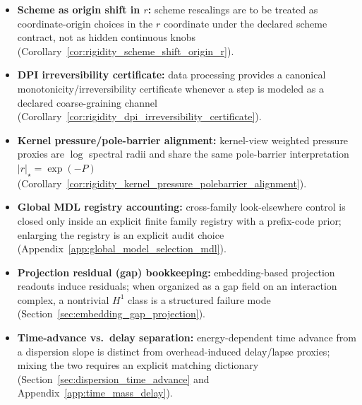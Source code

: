 \begin{itemize}
\item \AuditTag \textbf{Scheme as origin shift in $r$:} scheme rescalings are to be treated as coordinate-origin choices in the $r$ coordinate under the declared scheme contract, not as hidden continuous knobs (Corollary~\ref{cor:rigidity_scheme_shift_origin_r}).
\item \AuditTag \textbf{DPI irreversibility certificate:} data processing provides a canonical monotonicity/irreversibility certificate whenever a step is modeled as a declared coarse-graining channel (Corollary~\ref{cor:rigidity_dpi_irreversibility_certificate}).
\item \AuditTag \textbf{Kernel pressure/pole-barrier alignment:} kernel-view weighted pressure proxies are $\log$ spectral radii and share the same pole-barrier interpretation $|r|_\star=\exp(-P)$ (Corollary~\ref{cor:rigidity_kernel_pressure_polebarrier_alignment}).
\item \AuditTag \textbf{Global MDL registry accounting:} cross-family look-elsewhere control is closed only inside an explicit finite family registry with a prefix-code prior; enlarging the registry is an explicit audit choice (Appendix~\ref{app:global_model_selection_mdl}).
\item \AuditTag \textbf{Projection residual (gap) bookkeeping:} embedding-based projection readouts induce residuals; when organized as a gap field on an interaction complex, a nontrivial $H^1$ class is a structured failure mode (Section~\ref{sec:embedding_gap_projection}).
\item \AuditTag \textbf{Time-advance vs.\ delay separation:} energy-dependent time advance from a dispersion slope is distinct from overhead-induced delay/lapse proxies; mixing the two requires an explicit matching dictionary (Section~\ref{sec:dispersion_time_advance} and Appendix~\ref{app:time_mass_delay}).
\end{itemize}

